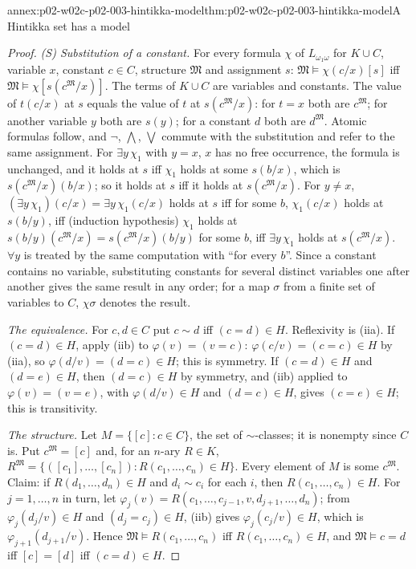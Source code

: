 \begin{annexitem}{annex:p02-w02c-p02-003-hintikka-model}{thm:p02-w02c-p02-003-hintikka-model}{A Hintikka set has a model}
\begin{proof}
\emph{(S) Substitution of a constant.}  For every formula \(\chi\) of
\(L_{\omega_1\omega}\) for \(K\cup C\), variable \(x\), constant
\(c\in C\), structure \(\mathfrak M\) and assignment \(s\):
\(\mathfrak M\models\chi(c/x)[s]\) iff
\(\mathfrak M\models\chi[s(c^{\mathfrak M}/x)]\).  The terms of \(K\cup C\)
are variables and constants.  The value of \(t(c/x)\) at \(s\) equals the
value of \(t\) at \(s(c^{\mathfrak M}/x)\): for \(t=x\) both are
\(c^{\mathfrak M}\); for another variable \(y\) both are \(s(y)\); for a
constant \(d\) both are \(d^{\mathfrak M}\).  Atomic formulas follow, and
\(\neg\), \(\bigwedge\), \(\bigvee\) commute with the substitution and
refer to the same assignment.  For \(\exists y\,\chi_1\) with \(y=x\),
\(x\) has no free occurrence, the formula is unchanged, and it holds at
\(s\) iff \(\chi_1\) holds at some \(s(b/x)\), which is
\(s(c^{\mathfrak M}/x)(b/x)\); so it holds at \(s\) iff it holds at
\(s(c^{\mathfrak M}/x)\).  For \(y\neq x\), \((\exists
y\,\chi_1)(c/x)=\exists y\,\chi_1(c/x)\) holds at \(s\) iff for some
\(b\), \(\chi_1(c/x)\) holds at \(s(b/y)\), iff (induction hypothesis)
\(\chi_1\) holds at \(s(b/y)(c^{\mathfrak M}/x)=s(c^{\mathfrak M}/x)(b/y)\)
for some \(b\), iff \(\exists y\,\chi_1\) holds at
\(s(c^{\mathfrak M}/x)\).  \(\forall y\) is treated by the same
computation with ``for every \(b\)''.  Since a constant contains no
variable, substituting constants for several distinct variables one after
another gives the same result in any order; for a map \(\sigma\) from a
finite set of variables to \(C\), \(\chi\sigma\) denotes the result.

\emph{The equivalence.}  For \(c,d\in C\) put \(c\sim d\) iff
\((c=d)\in H\).  Reflexivity is (iia).  If \((c=d)\in H\), apply (iib) to
\(\varphi(v)=(v=c)\): \(\varphi(c/v)=(c=c)\in H\) by (iia), so
\(\varphi(d/v)=(d=c)\in H\); this is symmetry.  If \((c=d)\in H\) and
\((d=e)\in H\), then \((d=c)\in H\) by symmetry, and (iib) applied to
\(\varphi(v)=(v=e)\), with \(\varphi(d/v)\in H\) and \((d=c)\in H\), gives
\((c=e)\in H\); this is transitivity.

\emph{The structure.}  Let \(M=\{[c]:c\in C\}\), the set of
\(\sim\)-classes; it is nonempty since \(C\) is.  Put
\(c^{\mathfrak M}=[c]\) and, for an \(n\)-ary \(R\in K\),
\(R^{\mathfrak M}=\{([c_1],\ldots,[c_n]):R(c_1,\ldots,c_n)\in H\}\).  Every
element of \(M\) is some \(c^{\mathfrak M}\).  Claim: if
\(R(d_1,\ldots,d_n)\in H\) and \(d_i\sim c_i\) for each \(i\), then
\(R(c_1,\ldots,c_n)\in H\).  For \(j=1,\ldots,n\) in turn, let
\(\varphi_j(v)=R(c_1,\ldots,c_{j-1},v,d_{j+1},\ldots,d_n)\); from
\(\varphi_j(d_j/v)\in H\) and \((d_j=c_j)\in H\), (iib) gives
\(\varphi_j(c_j/v)\in H\), which is \(\varphi_{j+1}(d_{j+1}/v)\).  Hence
\(\mathfrak M\models R(c_1,\ldots,c_n)\) iff \(R(c_1,\ldots,c_n)\in H\), and
\(\mathfrak M\models c=d\) iff \([c]=[d]\) iff \((c=d)\in H\).


\end{proof}
\end{annexitem}
